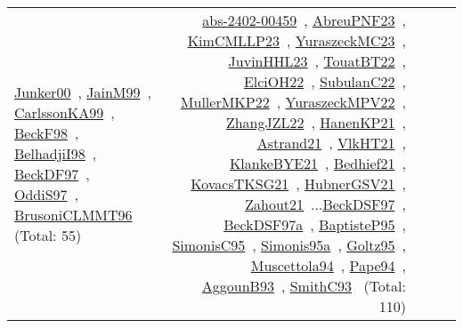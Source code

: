 {\begin{longtable}{p{3cm}r>{\raggedright\arraybackslash}p{6cm}>{\raggedright\arraybackslash}p{6cm}>{\raggedright\arraybackslash}p{8cm}}
\href{../works/Junker00.pdf}{Junker00}~\cite{Junker00}, \href{../works/JainM99.pdf}{JainM99}~\cite{JainM99}, \href{../works/CarlssonKA99.pdf}{CarlssonKA99}~\cite{CarlssonKA99}, \href{../works/BeckF98.pdf}{BeckF98}~\cite{BeckF98}, \href{../works/BelhadjiI98.pdf}{BelhadjiI98}~\cite{BelhadjiI98}, \href{../works/BeckDF97.pdf}{BeckDF97}~\cite{BeckDF97}, \href{../works/OddiS97.pdf}{OddiS97}~\cite{OddiS97}, \href{../works/BrusoniCLMMT96.pdf}{BrusoniCLMMT96}~\cite{BrusoniCLMMT96} (Total: 55) & \href{../works/abs-2402-00459.pdf}{abs-2402-00459}~\cite{abs-2402-00459}, \href{../works/AbreuPNF23.pdf}{AbreuPNF23}~\cite{AbreuPNF23}, \href{../works/KimCMLLP23.pdf}{KimCMLLP23}~\cite{KimCMLLP23}, \href{../works/YuraszeckMC23.pdf}{YuraszeckMC23}~\cite{YuraszeckMC23}, \href{../works/JuvinHHL23.pdf}{JuvinHHL23}~\cite{JuvinHHL23}, \href{../works/TouatBT22.pdf}{TouatBT22}~\cite{TouatBT22}, \href{../works/ElciOH22.pdf}{ElciOH22}~\cite{ElciOH22}, \href{../works/SubulanC22.pdf}{SubulanC22}~\cite{SubulanC22}, \href{../works/MullerMKP22.pdf}{MullerMKP22}~\cite{MullerMKP22}, \href{../works/YuraszeckMPV22.pdf}{YuraszeckMPV22}~\cite{YuraszeckMPV22}, \href{../works/ZhangJZL22.pdf}{ZhangJZL22}~\cite{ZhangJZL22}, \href{../works/HanenKP21.pdf}{HanenKP21}~\cite{HanenKP21}, \href{../works/Astrand21.pdf}{Astrand21}~\cite{Astrand21}, \href{../works/VlkHT21.pdf}{VlkHT21}~\cite{VlkHT21}, \href{../works/KlankeBYE21.pdf}{KlankeBYE21}~\cite{KlankeBYE21}, \href{../works/Bedhief21.pdf}{Bedhief21}~\cite{Bedhief21}, \href{../works/KovacsTKSG21.pdf}{KovacsTKSG21}~\cite{KovacsTKSG21}, \href{../works/HubnerGSV21.pdf}{HubnerGSV21}~\cite{HubnerGSV21}, \href{../works/Zahout21.pdf}{Zahout21}~\cite{Zahout21}...\href{../works/BeckDSF97.pdf}{BeckDSF97}~\cite{BeckDSF97}, \href{../works/BeckDSF97a.pdf}{BeckDSF97a}~\cite{BeckDSF97a}, \href{../works/BaptisteP95.pdf}{BaptisteP95}~\cite{BaptisteP95}, \href{../works/SimonisC95.pdf}{SimonisC95}~\cite{SimonisC95}, \href{../works/Simonis95a.pdf}{Simonis95a}~\cite{Simonis95a}, \href{../works/Goltz95.pdf}{Goltz95}~\cite{Goltz95}, \href{../works/Muscettola94.pdf}{Muscettola94}~\cite{Muscettola94}, \href{../works/Pape94.pdf}{Pape94}~\cite{Pape94}, \href{../works/AggounB93.pdf}{AggounB93}~\cite{AggounB93}, \href{../works/SmithC93.pdf}{SmithC93}~\cite{SmithC93} (Total: 110)\\

\end{longtable}}
